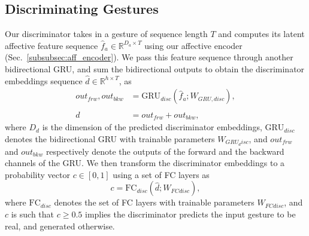 \documentclass[conference,compsoc]{IEEEtran}
\theoremstyle{definition}
\newcommand{\parens}[1]{\left(#1\right)}
\newcommand{\bracks}[1]{\left[#1\right]}
\begin{document}
\subsection{Discriminating Gestures}\label{subsec:discriminator}
Our discriminator takes in a gesture of sequence length $T$ and computes its latent affective feature sequence $\hat{f}_a \in \mathbb{R}^{D_a \times T}$ using our affective encoder (Sec.~\ref{subsubsec:aff_encoder}). We pass this feature sequence through another bidirectional GRU, and sum the bidirectional outputs to obtain the discriminator embeddings sequence $\hat{d} \in \mathbb{R}^{h \times T}$, as
\begin{align}
    out_{frw}, out_{bkw} &= \textrm{GRU}_{disc}\parens{\hat{f}_a; W_{GRU, disc}}, \\
    \hat{d} &= out_{frw} + out_{bkw},
\end{align}
where $D_d$ is the dimension of the predicted discriminator embeddings, $\textrm{GRU}_{disc}$ denotes the bidirectional GRU with trainable parameters $W_{GRU_disc}$, and $out_{frw}$ and $out_{bkw}$ respectively denote the outputs of the forward and the backward channels of the GRU. We then transform the discriminator embeddings to a probability vector $c \in \bracks{0, 1}$ using a set of FC layers as
\begin{equation}
    c = \textrm{FC}_{disc}\parens{\hat{d}; W_{FC disc}},
\end{equation}
where $\textrm{FC}_{disc}$ denotes the set of FC layers with trainable parameters $W_{FC disc}$, and $c$ is such that $c \geq 0.5$ implies the discriminator predicts the input gesture to be real, and generated otherwise.

\begin{table}[t]
    \centering
    \caption{Hyperparameters (HPs) for our network. We chose all the values via empirical search.}
    \label{tab:hyperparams}
    \vspace{-10pt}
\end{table}
\end{document}

